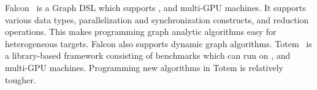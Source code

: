 Falcon~\cite{falcon} is a Graph DSL which supports \CPU, \GPU and multi-GPU machines. It supports various data types, parallelization and synchronization constructs, and reduction operations. This makes programming graph analytic algorithms easy for heterogeneous targets. Falcon also supports dynamic graph algorithms. 
Totem~\cite{Gharaibeh:2012:YOT:2370816.2370866} is  a library-based framework consisting of benchmarks which can run on \CPU, \GPU and multi-GPU machines. Programming new algorithms in Totem is relatively tougher.

\begin{table}
\centering
{}
\caption{Comparison of different graph frameworks}
\label{background:table1}
\end{table}

